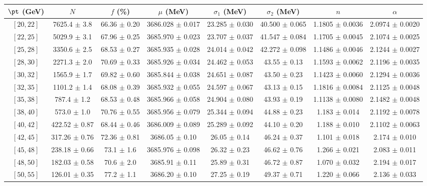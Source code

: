 \begin{tabular}{c||c|c|c|c|c|c|c}
$\pt$ (GeV) & $N$ & $f$ (\%) & $\mu$ (MeV) & $\sigma_1$ (MeV) & $\sigma_2$ (MeV) & $n$ & $\alpha$ \\
\hline
$[20, 22]$ & 7625.4 $\pm$ 3.8 & 66.36 $\pm$ 0.20 & 3686.028 $\pm$ 0.017 & 23.285 $\pm$ 0.030 & 40.500 $\pm$ 0.065 & 1.1805 $\pm$ 0.0036 & 2.0974 $\pm$ 0.0020\\
$[22, 25]$ & 5029.9 $\pm$ 3.1 & 67.96 $\pm$ 0.25 & 3685.970 $\pm$ 0.023 & 23.707 $\pm$ 0.037 & 41.547 $\pm$ 0.084 & 1.1705 $\pm$ 0.0045 & 2.1074 $\pm$ 0.0025\\
$[25, 28]$ & 3350.6 $\pm$ 2.5 & 68.53 $\pm$ 0.27 & 3685.935 $\pm$ 0.028 & 24.014 $\pm$ 0.042 & 42.272 $\pm$ 0.098 & 1.1486 $\pm$ 0.0046 & 2.1244 $\pm$ 0.0027\\
$[28, 30]$ & 2271.3 $\pm$ 2.0 & 70.69 $\pm$ 0.33 & 3685.926 $\pm$ 0.034 & 24.462 $\pm$ 0.053 & 43.55 $\pm$ 0.13 & 1.1593 $\pm$ 0.0062 & 2.1196 $\pm$ 0.0035\\
$[30, 32]$ & 1565.9 $\pm$ 1.7 & 69.82 $\pm$ 0.60 & 3685.844 $\pm$ 0.038 & 24.651 $\pm$ 0.087 & 43.50 $\pm$ 0.23 & 1.1423 $\pm$ 0.0060 & 2.1294 $\pm$ 0.0036\\
$[32, 35]$ & 1101.2 $\pm$ 1.4 & 68.08 $\pm$ 0.39 & 3685.932 $\pm$ 0.055 & 24.597 $\pm$ 0.067 & 43.13 $\pm$ 0.15 & 1.1816 $\pm$ 0.0084 & 2.1125 $\pm$ 0.0048\\
$[35, 38]$ & 787.4 $\pm$ 1.2 & 68.53 $\pm$ 0.48 & 3685.966 $\pm$ 0.058 & 24.904 $\pm$ 0.080 & 43.93 $\pm$ 0.19 & 1.1138 $\pm$ 0.0080 & 2.1482 $\pm$ 0.0048\\
$[38, 40]$ & 573.0 $\pm$ 1.0 & 70.76 $\pm$ 0.55 & 3685.956 $\pm$ 0.079 & 25.344 $\pm$ 0.094 & 44.88 $\pm$ 0.23 & 1.183 $\pm$ 0.014 & 2.1192 $\pm$ 0.0078\\
$[40, 42]$ & 422.52 $\pm$ 0.87 & 68.44 $\pm$ 0.46 & 3686.009 $\pm$ 0.089 & 25.289 $\pm$ 0.092 & 44.10 $\pm$ 0.20 & 1.188 $\pm$ 0.010 & 2.1102 $\pm$ 0.0063\\
$[42, 45]$ & 317.26 $\pm$ 0.76 & 72.36 $\pm$ 0.81 & 3686.05 $\pm$ 0.10 & 26.05 $\pm$ 0.14 & 46.24 $\pm$ 0.37 & 1.101 $\pm$ 0.018 & 2.174 $\pm$ 0.010\\
$[45, 48]$ & 238.18 $\pm$ 0.66 & 73.1 $\pm$ 1.6 & 3685.976 $\pm$ 0.098 & 26.32 $\pm$ 0.23 & 46.62 $\pm$ 0.76 & 1.266 $\pm$ 0.021 & 2.083 $\pm$ 0.011\\
$[48, 50]$ & 182.03 $\pm$ 0.58 & 70.6 $\pm$ 2.0 & 3685.91 $\pm$ 0.11 & 25.89 $\pm$ 0.31 & 46.72 $\pm$ 0.87 & 1.070 $\pm$ 0.032 & 2.194 $\pm$ 0.017\\
$[50, 55]$ & 126.01 $\pm$ 0.35 & 77.2 $\pm$ 1.1 & 3686.20 $\pm$ 0.10 & 27.25 $\pm$ 0.19 & 49.37 $\pm$ 0.71 & 1.220 $\pm$ 0.066 & 2.136 $\pm$ 0.033\\

\end{tabular}

